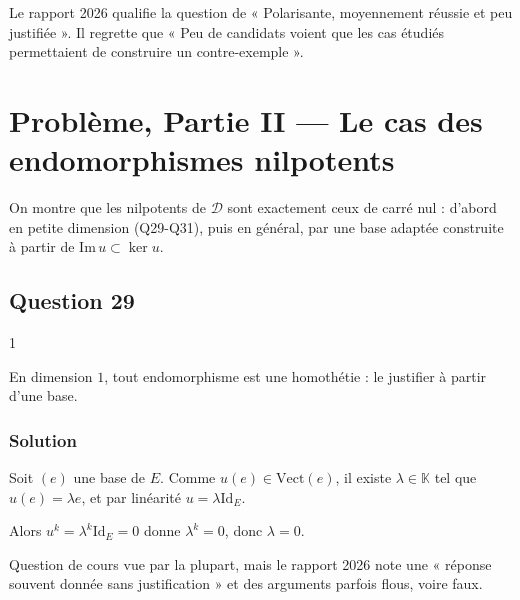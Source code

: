 \documentclass[11pt,a4paper]{article}
\newcommand{\equationajustee}[1]{%
  \sbox{\boiteequation}{$\displaystyle #1$}%
  \ifdim\wd\boiteequation>\linewidth
    \[\resizebox{\linewidth}{!}{\usebox{\boiteequation}}\]%
  \else
    \[#1\]%
  \fi}
\begin{document}
\begin{jury}

Le rapport 2026 qualifie la question de « Polarisante, moyennement réussie et peu justifiée ». Il regrette que « Peu de candidats voient que les cas étudiés permettaient de construire un contre-exemple ».

\end{jury}

\hypertarget{probluxe8me-partie-ii-le-cas-des-endomorphismes-nilpotents}{%
\section{Problème, Partie II --- Le cas des endomorphismes nilpotents}\label{probluxe8me-partie-ii-le-cas-des-endomorphismes-nilpotents}}

On montre que les nilpotents de \(\mathcal D\) sont exactement ceux de carré nul : d'abord en petite dimension (Q29-Q31), puis en général, par une base adaptée construite à partir de \(\mathrm{Im}\,u\subset\ker u\).

\hypertarget{question-29}{%
\subsection{Question 29}\label{question-29}}

\begin{indication}{1}

En dimension \(1\), tout endomorphisme est une homothétie : le justifier à partir d'une base.

\end{indication}

\hypertarget{solution-28}{%
\subsubsection{Solution}\label{solution-28}}

Soit \((e)\) une base de \(E\). Comme \(u(e)\in\mathrm{Vect}(e)\), il existe \(\lambda\in\mathbb K\) tel que \(u(e)=\lambda e\), et par linéarité \(u=\lambda{\mathrm{Id}}_E\).

Alors \(u^k=\lambda^k{\mathrm{Id}}_E=0\) donne \(\lambda^k=0\), donc \(\lambda=0\).

\equationajustee{\boxed{u=0.}}

\begin{jury}

Question de cours vue par la plupart, mais le rapport 2026 note une « réponse souvent donnée sans justification » et des arguments parfois flous, voire faux.

\end{jury}
\end{document}
